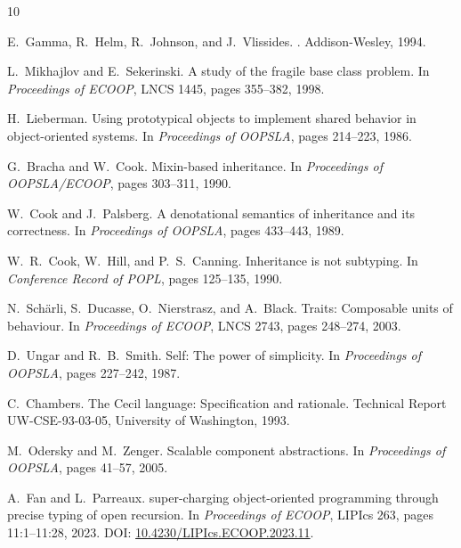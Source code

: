 \documentclass[sigplan,10pt,review,anonymous]{acmart}
\theoremstyle{acmplain}
\begin{document}

\begin{thebibliography}{10}

E.~Gamma, R.~Helm, R.~Johnson, and J.~Vlissides.
.
\newblock Addison-Wesley, 1994.

L.~Mikhajlov and E.~Sekerinski.
\newblock A study of the fragile base class problem.
\newblock In {\em Proceedings of ECOOP}, LNCS 1445, pages 355--382, 1998.

H.~Lieberman.
\newblock Using prototypical objects to implement shared behavior in
  object-oriented systems.
\newblock In {\em Proceedings of OOPSLA}, pages 214--223, 1986.

G.~Bracha and W.~Cook.
\newblock Mixin-based inheritance.
\newblock In {\em Proceedings of OOPSLA/ECOOP}, pages 303--311, 1990.

W.~Cook and J.~Palsberg.
\newblock A denotational semantics of inheritance and its correctness.
\newblock In {\em Proceedings of OOPSLA}, pages 433--443, 1989.

W.~R.~Cook, W.~Hill, and P.~S.~Canning.
\newblock Inheritance is not subtyping.
\newblock In {\em Conference Record of POPL}, pages 125--135, 1990.

N.~Sch{\"a}rli, S.~Ducasse, O.~Nierstrasz, and A.~Black.
\newblock Traits: Composable units of behaviour.
\newblock In {\em Proceedings of ECOOP}, LNCS 2743, pages 248--274, 2003.

D.~Ungar and R.~B.~Smith.
\newblock Self: The power of simplicity.
\newblock In {\em Proceedings of OOPSLA}, pages 227--242, 1987.

C.~Chambers.
\newblock The {Cecil} language: Specification and rationale.
\newblock Technical Report UW-CSE-93-03-05, University of Washington, 1993.

M.~Odersky and M.~Zenger.
\newblock Scalable component abstractions.
\newblock In {\em Proceedings of OOPSLA}, pages 41--57, 2005.

A.~Fan and L.~Parreaux.
\newblock super-charging object-oriented programming through precise typing of open recursion.
\newblock In {\em Proceedings of ECOOP}, LIPIcs 263, pages 11:1--11:28, 2023.
\newblock DOI: \href{https://doi.org/10.4230/LIPIcs.ECOOP.2023.11}{10.4230/LIPIcs.ECOOP.2023.11}.


\end{thebibliography}
\end{document}

